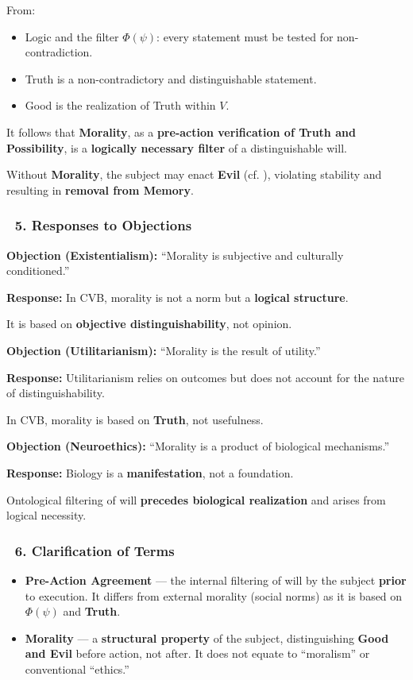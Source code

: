 \documentclass[12pt]{article}
\begin{document}
From:

\begin{itemize}
\item \text{[11.1]} Logic and the filter $\Phi(\psi)$: every statement must be tested for non-contradiction.
\item \text{[11.2]} Truth is a non-contradictory and distinguishable statement.
\item \text{[11.3]} Good is the realization of Truth within $V$.
\end{itemize}

It follows that \textbf{Morality}, as a \textbf{pre-action verification of Truth and Possibility}, is a \textbf{logically necessary filter} of a distinguishable will.

Without \textbf{Morality}, the subject may enact \textbf{Evil} (cf. \text{[11.3.2]}), violating stability and resulting in \textbf{removal from Memory}.

\subsubsection*{🔹 5. Responses to Objections}

\textbf{Objection (Existentialism):} ``Morality is subjective and culturally conditioned.''

\textbf{Response:} In CVB, morality is not a norm but a \textbf{logical structure}.

It is based on \textbf{objective distinguishability}, not opinion.

\textbf{Objection (Utilitarianism):} ``Morality is the result of utility.''

\textbf{Response:} Utilitarianism relies on outcomes but does not account for the nature of distinguishability.

In CVB, morality is based on \textbf{Truth}, not usefulness.

\textbf{Objection (Neuroethics):} ``Morality is a product of biological mechanisms.''

\textbf{Response:} Biology is a \textbf{manifestation}, not a foundation.

Ontological filtering of will \textbf{precedes biological realization} and arises from logical necessity.

\subsubsection*{🔹 6. Clarification of Terms}

\begin{itemize}
\item \textbf{Pre-Action Agreement} — the internal filtering of will by the subject \textbf{prior} to execution. It differs from external morality (social norms) as it is based on $\Phi(\psi)$ and \textbf{Truth}.
\item \textbf{Morality} — a \textbf{structural property} of the subject, distinguishing \textbf{Good and Evil} before action, not after. It does not equate to ``moralism'' or conventional ``ethics.''
\end{itemize}
\end{document}
